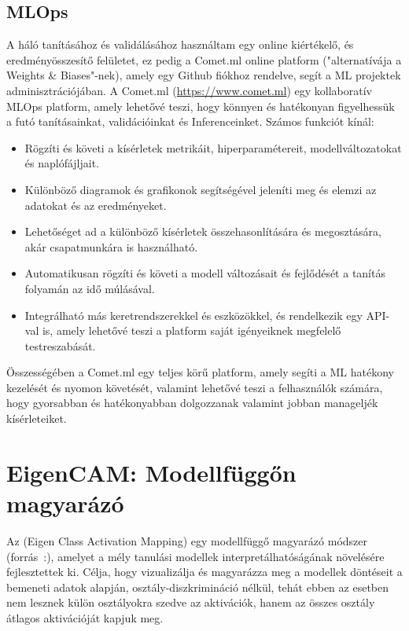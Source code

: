 \documentclass[12pt,oneside,a4paper]{article}
\newcommand{\newsection}[1]{\clearpage\section{#1}}\label{makro}
\theoremstyle{remark}
\newtheorem*{observation}{ \newline \textit}
\begin{document}
\subsection{MLOps}\label{subsec:mlops}
A háló tanításához és validálásához használtam egy online kiértékelő, és eredményösszesítő felületet, ez pedig a Comet.ml online platform ("alternatívája a Weights \& Biases"-nek), amely egy Github fiókhoz rendelve, segít a \ac{ML} projektek adminisztrációjában.
A Comet.ml (\url{https://www.comet.ml}) egy kollaboratív \ac{MLOps} platform, amely lehetővé teszi, hogy könnyen és
    hatékonyan figyelhessük a futó tanításainkat, validációinkat és \gls{Inference}inket.
    Számos funkciót kínál:
    \begin{itemize}
        \item Rögzíti és követi a kísérletek metrikáit, hiperparamétereit, modellváltozatokat és naplófájljait.
        \item Különböző diagramok és grafikonok segítségével jeleníti meg és elemzi az adatokat és az eredményeket.
        \item Lehetőséget ad a különböző kísérletek összehasonlítására és megosztására, akár csapatmunkára is használható.
        \item Automatikusan rögzíti és követi a modell változásait és fejlődését a tanítás folyamán az idő múlásával.
        \item Integrálható más keretrendszerekkel és eszközökkel, és rendelkezik egy API-val is, amely lehetővé teszi a platform
            saját igényeiknek megfelelő testreszabását.
    \end{itemize}
    \begin{observation}
        Összességében a Comet.ml egy teljes körű platform, amely segíti a \ac{ML} hatékony kezelését
        és nyomon követését, valamint lehetővé teszi a felhasználók számára, hogy gyorsabban és hatékonyabban dolgozzanak
        valamint jobban manageljék kísérleteiket.
    \end{observation}

\newsection{EigenCAM: Modellfüggőn magyarázó}\label{sec:eigencam:-modellfuggo-magyarazo}
     Az  (Eigen Class Activation Mapping) egy modellfüggő magyarázó módszer (forrás~\cite{pytorch-grad-cam}:), amelyet a mély tanulási
     modellek interpretálhatóságának növelésére fejlesztettek ki.
     Célja, hogy vizualizálja és magyarázza meg a modellek döntéseit a bemeneti adatok alapján,
     osztály-diszkrimináció nélkül, tehát ebben az esetben nem lesznek külön osztályokra szedve az aktivációk, hanem az
     összes osztály átlagos aktivációját kapjuk meg.
\end{document}
